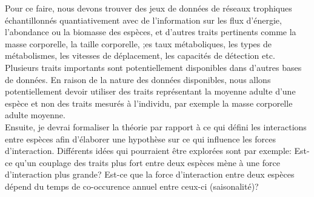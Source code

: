 \documentclass[12pt]{article}
\begin{document}
Pour ce faire, nous devons trouver des jeux de données de réseaux trophiques échantillonnés quantiativement avec de l'information sur les flux d'énergie, l'abondance ou la biomasse des espèces, et d'autres traits pertinents comme la masse corporelle, la taille corporelle, ;es taux métaboliques, les types de métabolismes, les vitesses de déplacement, les capacités de détection etc. Plusieurs traits importants sont potentiellement disponibles dans d'autres bases de données. En raison de la nature des données disponibles, nous allons potentiellement devoir utiliser des traits représentant la moyenne adulte d'une espèce et non des traits mesurés à l'individu, par exemple la masse corporelle adulte moyenne.\\

Ensuite, je devrai formaliser la théorie par rapport à ce qui défini les interactions entre espèces afin d'élaborer une hypothèse sur ce qui influence les forces d'interaction. Différents idées qui pourraient être explorées sont par exemple: Est-ce qu'un couplage des traits plus fort entre deux espèces mène à une force d'interaction plus grande? Est-ce que la force d'interaction entre deux espèces dépend du temps de co-occurence annuel entre ceux-ci (saisonalité)?\\


\pagebreak


\end{document}
